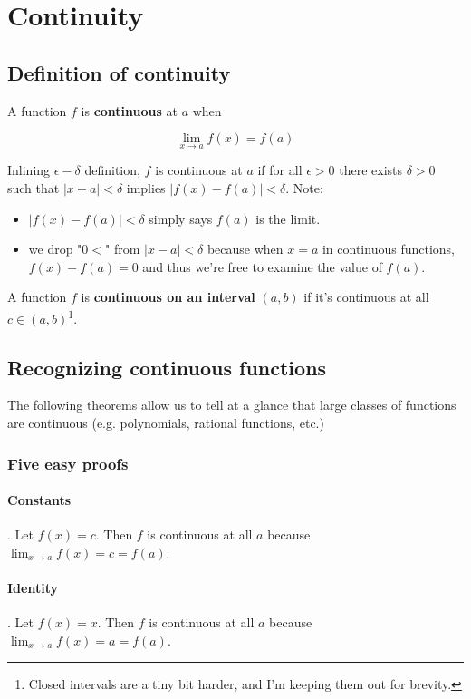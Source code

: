 \section{Continuity}

\subsection{Definition of continuity}

A function $f$ is \textbf{continuous} at $a$ when

\[\lim_{x\to a}f(x)=f(a)\]

Inlining $\epsilon-\delta$ definition, $f$ is continuous at $a$ if for all
$\epsilon>0$ there exists $\delta>0$ such that $|x-a|<\delta$ implies
$|f(x)-f(a)|<\delta$. Note:

\begin{itemize}
    \item $|f(x)-f(a)|<\delta$ simply says $f(a)$ is the limit.
    \item we drop "$0<$" from $|x-a|<\delta$ because when $x=a$ in
      continuous functions, $f(x)-f(a)=0$ and thus we're free to
      examine the value of $f(a)$.
\end{itemize}

A function $f$ is \textbf{continuous on an interval} $(a, b)$ if it's
continuous at all $c\in(a,b)$\footnote{Closed intervals are a tiny bit
  harder, and I'm keeping them out for brevity.}.

\subsection{Recognizing continuous functions}
The following theorems allow us to tell at a glance that large classes
of functions are continuous (e.g. polynomials, rational functions,
etc.)

\subsubsection*{Five easy proofs}

\paragraph{Constants}. Let $f(x)=c$. Then $f$ is continuous at all $a$
because $\lim_{x\to a}f(x)=c=f(a)$.

\vs

\paragraph{Identity}. Let $f(x)=x$. Then $f$ is continuous at all $a$
because $\lim_{x\to a}f(x)=a=f(a)$.

